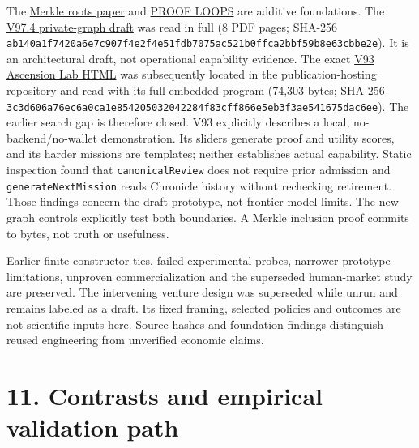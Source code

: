 \documentclass[
  10pt,
]{article}
\let\studysection\section
\renewcommand{\section}{\Needspace{7\baselineskip}\studysection}
\begin{document}
The
\href{https://github.com/MontrealAI/goalos-agialpha-sovereign-machine-economy/blob/1e9a5675b1662e98074fb1c71cf2c5b94c7d259f/docs/paper/Merkle_Roots_for_the_Validated_Skill_Graph_v114.pdf}{Merkle
roots paper} and
\href{https://github.com/MontrealAI/goalos-agialpha-sovereign-machine-economy/blob/1e9a5675b1662e98074fb1c71cf2c5b94c7d259f/docs/paper/PROOF_LOOPS_research_paper_v2_author_edition.pdf}{PROOF
LOOPS} are additive foundations. The
\href{https://github.com/MontrealAI/goalos-agialpha-sovereign-machine-economy/blob/1e9a5675b1662e98074fb1c71cf2c5b94c7d259f/docs/paper/goalos_private_onchain_zk_vsg.pdf}{V97.4
private-graph draft} was read in full (8 PDF pages; SHA-256
\nolinkurl{ab140a1f7420a6e7c907f4e2f4e51fdb7075ac521b0ffca2bbf59b8e63cbbe2e}).
It is an architectural draft, not operational capability evidence. The
exact
\href{https://github.com/MontrealAI/MontrealAI.github.io/blob/a9cc143bc05495405ac63b0e2645c425d66410b8/goalos-v93-rsi-validated-skill-graph-ascension-lab-interface.html}{V93
Ascension Lab HTML} was subsequently located in the publication-hosting
repository and read with its full embedded program (74,303 bytes;
SHA-256
\nolinkurl{3c3d606a76ec6a0ca1e854205032042284f83cff866e5eb3f3ae541675dac6ee}).
The earlier search gap is therefore closed. V93 explicitly describes a
local, no-backend/no-wallet demonstration. Its sliders generate proof
and utility scores, and its harder missions are templates; neither
establishes actual capability. Static inspection found that
\texttt{canonicalReview} does not require prior admission and
\texttt{generateNextMission} reads Chronicle history without rechecking
retirement. Those findings concern the draft prototype, not
frontier-model limits. The new graph controls explicitly test both
boundaries. A Merkle inclusion proof commits to bytes, not truth or
usefulness.

Earlier finite-constructor ties, failed experimental probes, narrower
prototype limitations, unproven commercialization and the superseded
human-market study are preserved. The intervening venture design was
superseded while unrun and remains labeled as a draft. Its fixed
framing, selected policies and outcomes are not scientific inputs here.
Source hashes and foundation findings distinguish reused engineering
from unverified economic claims.

\hypertarget{11-contrasts-and-empirical-validation-path}{%
\section{11. Contrasts and empirical validation
path}\label{11-contrasts-and-empirical-validation-path}}
\end{document}
